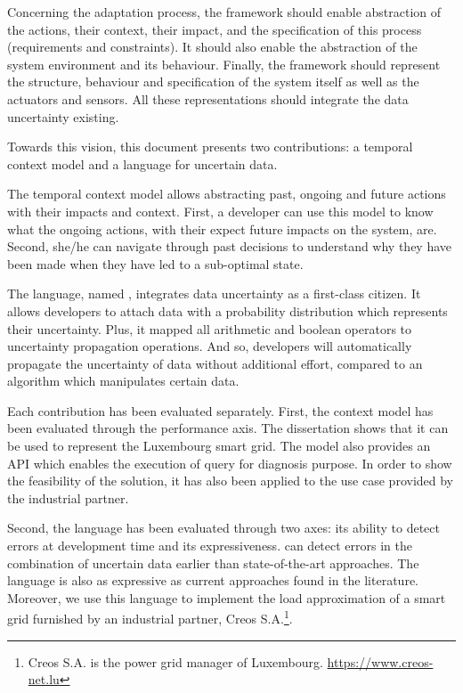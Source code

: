 Concerning the adaptation process, the framework should enable abstraction of the actions, their context, their impact, and the specification of this process (requirements and constraints).
It should also enable the abstraction of the system environment and its behaviour.
Finally, the framework should represent the structure, behaviour and specification of the system itself as well as the actuators and sensors.
All these representations should integrate the data uncertainty existing.

\bigskip
{}
Towards this vision, this document presents two contributions: a temporal context model and a language for uncertain data.

The temporal context model allows abstracting past, ongoing and future actions with their impacts and context.
First, a developer can use this model to know what the ongoing actions, with their expect future impacts on the system, are.
Second, she/he can navigate through past decisions to understand why they have been made when they have led to a sub-optimal state.

The language, named \langName, integrates data uncertainty as a first-class citizen.
It allows developers to attach data with a probability distribution which represents their uncertainty.
Plus, it mapped all arithmetic and boolean operators to uncertainty propagation operations. 
And so, developers will automatically propagate the uncertainty of data without additional effort, compared to an algorithm which manipulates certain data.

\bigskip
{}
Each contribution has been evaluated separately. 
First, the context model has been evaluated through the performance axis.
The dissertation shows that it can be used to represent the Luxembourg smart grid.
The model also provides an API which enables the execution of query for diagnosis purpose.
In order to show the feasibility of the solution, it has also been applied to the use case provided by the industrial partner.

Second, the language has been evaluated through two axes: its ability to detect errors at development time and its expressiveness.
\langName{} can detect errors in the combination of uncertain data earlier than state-of-the-art approaches.
The language is also as expressive as current approaches found in the literature.
Moreover, we use this language to implement the load approximation of a smart grid furnished by an industrial partner, Creos S.A.\footnote{Creos S.A. is the power grid manager of Luxembourg. \url{https://www.creos-net.lu}}.

\bigskip
\bigskip
\bigskip
{}

\vfill


